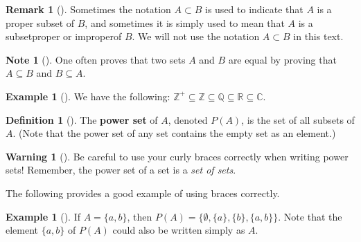 \documentclass[10pt,openany,oneside]{book}
\newcommand{\terminology}[1]{\textbf{#1}}
\theoremstyle{plain}
\theoremstyle{definition}
\newtheorem{definition}[theorem]{Definition}
\theoremstyle{definition}
\newtheorem{remark}[theorem]{Remark}
\newtheorem{note}[theorem]{Note}
\newtheorem{warning}[theorem]{Warning}
\theoremstyle{definition}
\newtheorem{example}[theorem]{Example}
\theoremstyle{definition}
\numberwithin{equation}{section}
\def\Z{\mathbb{Z}}
\def\R{\mathbb{R}}
\def\Q{\mathbb{Q}}
\def\C{\mathbb{C}}
\begin{document}
\begin{remark}[]\label{remark-1}
Sometimes the notation \(A\subset B\) is  used to indicate that \(A\) is a proper subset of \(B\), and sometimes it is simply used to mean that \(A\) is a subset\textemdash{}proper or improper\textemdash{}of \(B\). We will not use the notation \(A \subset B\) in this text.%
\end{remark}
\begin{note}[]\label{note-3}
One often proves that two sets \(A\) and \(B\) are equal by proving that \(A\subseteq B\) and \(B\subseteq A\).%
\end{note}
\begin{example}[]\label{example-2}
We have the following: \(\Z^+ \subseteq \Z \subseteq \Q \subseteq \R \subseteq \C\).%
\end{example}
\begin{definition}[{}]\label{definition-5}
\label{notation-16}
The \terminology{power set} of \(A\), denoted \(P(A)\), is the set of all subsets of \(A\). (Note that the power set of any set contains the empty set as an element.)%
\end{definition}
\begin{warning}[]\label{warning-2}
Be careful to use your curly braces correctly when writing power sets! Remember, the power set of a set is a \emph{set of sets}.%
\end{warning}
The following provides a good example of using braces correctly.%
\begin{example}[]\label{example-3}
If \(A=\{a,b\}\), then \(P(A)=\{\emptyset, \{a\}, \{b\}, \{a,b\}\}\). Note that the element \(\{a,b\}\) of \(P(A)\) could also be written simply as \(A\).%
\end{example}
\end{document}
